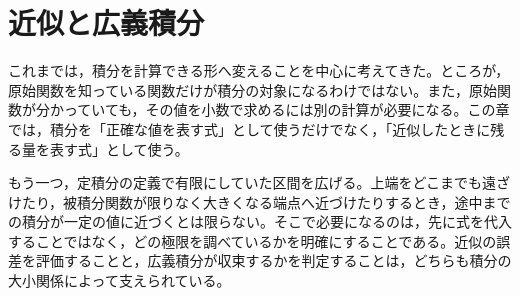 \chapter{近似と広義積分}\label{章:近似と広義積分}

これまでは，積分を計算できる形へ変えることを中心に考えてきた。ところが，原始関数を知っている関数だけが積分の対象になるわけではない。また，原始関数が分かっていても，その値を小数で求めるには別の計算が必要になる。この章では，積分を「正確な値を表す式」として使うだけでなく，「近似したときに残る量を表す式」として使う。

もう一つ，定積分の定義で有限にしていた区間を広げる。上端をどこまでも遠ざけたり，被積分関数が限りなく大きくなる端点へ近づけたりするとき，途中までの積分が一定の値に近づくとは限らない。そこで必要になるのは，先に式を代入することではなく，どの極限を調べているかを明確にすることである。近似の誤差を評価することと，広義積分が収束するかを判定することは，どちらも積分の大小関係によって支えられている。

%
%
%
%
%
%
%
